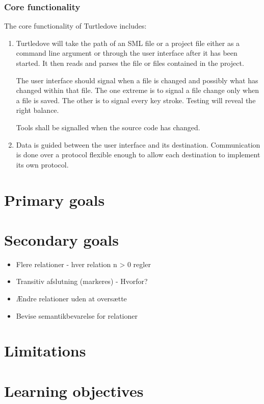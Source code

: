 \documentclass[a4paper,oneside]{article}
\begin{document}
\subsubsection{Core functionality}
The core functionality of Turtledove includes:
\begin{enumerate}
\item Turtledove will take the path of an SML file or a project file either as a command line
  argument or through the user interface after it has been started. It then reads and parses the
  file or files contained in the project.

  The user interface should signal when a file is changed and possibly what has changed within that
  file. The one extreme is to signal a file change only when a file is saved. The other is to signal
  every key stroke. Testing will reveal the right balance.

  Tools shall be signalled when the source code has changed.

\item Data is guided between the user interface and its destination. Communication is done over a
  protocol flexible enough to allow each destination to implement its own protocol.
\end{enumerate}

\section{Primary goals}

\section{Secondary goals}
\begin{itemize}
\item Flere relationer - hver relation n > 0 regler
\item Transitiv afslutning (markeres)
  - Hvorfor?
\item Ændre relationer uden at oversætte
\item Bevise semantikbevarelse for relationer
\end{itemize}


\section{Limitations}

\section{Learning objectives}
\end{document}

